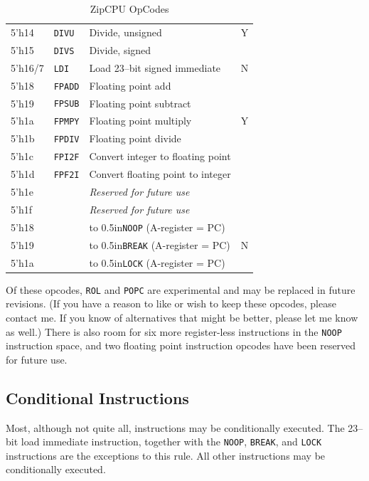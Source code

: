 \documentclass{gqtekspec}
\begin{document}
\begin{table}
\begin{center}
\begin{tabular}{|l|l|l|c|}
5'h14 & {\tt DIVU} & Divide, unsigned & Y \\\cline{1-3}
5'h15 & {\tt DIVS} & Divide, signed &  \\\hline\hline
5'h16/7 & {\tt LDI} & Load 23--bit signed immediate & N \\\hline\hline
5'h18 & {\tt FPADD} & Floating point add &  \\\cline{1-3}
5'h19 & {\tt FPSUB} & Floating point subtract &   \\\cline{1-3}
5'h1a & {\tt FPMPY} & Floating point multiply & Y \\\cline{1-3}
5'h1b & {\tt FPDIV} & Floating point divide &   \\\cline{1-3}
5'h1c & {\tt FPI2F} & Convert integer to floating point &   \\\cline{1-3}
5'h1d & {\tt FPF2I} & Convert floating point to integer &   \\\hline
5'h1e & & {\em Reserved for future use} &\\\hline
5'h1f & & {\em Reserved for future use} &\\\hline
5'h18 & & \hbox to 0.5in{\tt NOOP}  (A-register = PC)&\\\cline{1-3}
5'h19 & & \hbox to 0.5in{\tt BREAK} (A-register = PC)& N\\\cline{1-3}
5'h1a & & \hbox to 0.5in{\tt LOCK}  (A-register = PC)&\\\hline
\end{tabular}
\caption{ZipCPU OpCodes}\label{tbl:iset-opcodes}
\end{center}\end{table}
%
Of these opcodes, {\tt ROL} and {\tt POPC} are experimental and may be
replaced in future revisions.  (If you have a reason to like or wish to keep
these opcodes, please contact me.  If you know of alternatives that might be
better, please let me know as well.)  There is also room for six more
register-less instructions in the {\tt NOOP} instruction space,
and two floating point instruction opcodes have been reserved for future use.

\subsection{Conditional Instructions}\label{sec:isa-cond}
Most, although not quite all, instructions may be conditionally executed.  
The 23--bit load immediate instruction, together with the {\tt NOOP}, 
{\tt BREAK}, and {\tt LOCK} instructions are the exceptions to this rule.
All other instructions may be conditionally executed.
\end{document}
